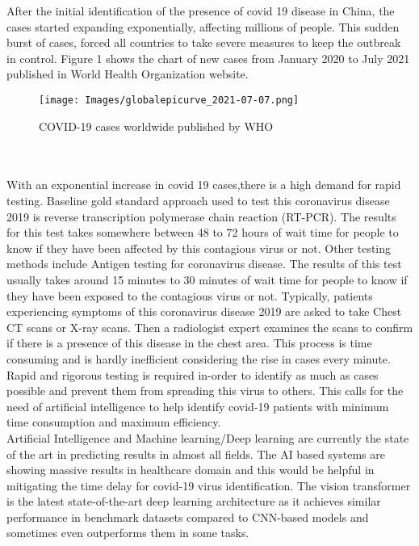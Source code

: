 \documentclass[conference]{IEEEtran}
\begin{document}
    After the initial identification of the presence of covid 19 disease in China, the cases started expanding exponentially, affecting millions of people. This sudden burst of cases, forced all countries to take severe measures to keep the outbreak in control. Figure 1 shows the chart  of new cases from January 2020 to July 2021 published in World Health Organization website.
    \begin{figure}[h]
    \texttt{[image: Images/globalepicurve\_2021-07-07.png]}
    \caption{\footnotesize{COVID-19 cases worldwide published by WHO \cite{covid19explorer}}}
    \label{fig:subim1}
    \end{figure}\\\\
    With an exponential increase in covid 19 cases,there is a high demand for rapid testing. Baseline gold standard approach used to test this coronavirus disease 2019 is reverse transcription polymerase chain reaction (RT-PCR). The results for this test takes somewhere between 48 to 72 hours of wait time for people to know if they have been affected by this contagious virus or not.  Other testing methods include Antigen testing for coronavirus disease. The results of this test usually takes around 15 minutes to 30 minutes of wait time for people to know if they have been exposed to the contagious virus or not. Typically, patients experiencing symptoms of this coronavirus disease 2019 are asked to take Chest CT scans or X-ray scans. Then a radiologist expert examines the scans to confirm if there is a presence of this disease in the chest area. This process is time consuming and is hardly inefficient considering the rise in cases every minute. Rapid and rigorous testing is required in-order to identify as much as cases possible and prevent them from spreading this virus to others. This calls for the need of artificial intelligence to help identify covid-19 patients with minimum time consumption and maximum efficiency.  \\
    
    Artificial Intelligence and Machine learning/Deep learning are currently the state of the art in predicting results in almost all fields. The AI based systems are showing massive results in healthcare domain and this would be helpful in mitigating the time delay for covid-19 virus identification. The vision transformer is the latest state-of-the-art deep learning architecture as it achieves similar performance in benchmark datasets compared to CNN-based models and sometimes even outperforms them in some tasks.
    
\end{document}
